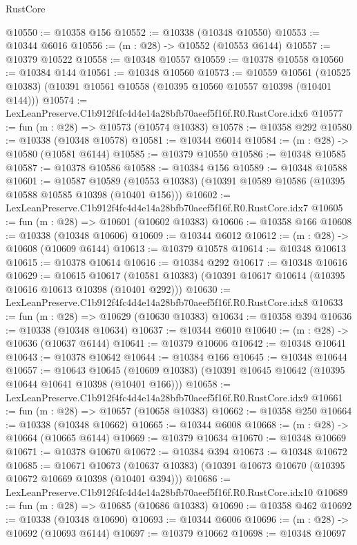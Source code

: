 \begin{lexlean}{RustCore}
\begin{coremodule}
@10550 := @10358 @156
@10552 := @10338 (@10348 @10550)
@10553 := @10344 @6016
@10556 := (m : @28) -> @10552 (@10553 @6144)
@10557 := @10379 @10522
@10558 := @10348 @10557
@10559 := @10378 @10558
@10560 := @10384 @144
@10561 := @10348 @10560
@10573 := @10559
    @10561
    (@10525 @10383)
    (@10391 @10561 @10558 (@10395 @10560 @10557 @10398 (@10401 @144)))
@10574 := LexLeanPreserve.C1b912f4fc4d4e14a28bfb70aeef5f16f.R0.RustCore.idx6
@10577 := fun (m : @28) => @10573 (@10574 @10383)
@10578 := @10358 @292
@10580 := @10338 (@10348 @10578)
@10581 := @10344 @6014
@10584 := (m : @28) -> @10580 (@10581 @6144)
@10585 := @10379 @10550
@10586 := @10348 @10585
@10587 := @10378 @10586
@10588 := @10384 @156
@10589 := @10348 @10588
@10601 := @10587
    @10589
    (@10553 @10383)
    (@10391 @10589 @10586 (@10395 @10588 @10585 @10398 (@10401 @156)))
@10602 := LexLeanPreserve.C1b912f4fc4d4e14a28bfb70aeef5f16f.R0.RustCore.idx7
@10605 := fun (m : @28) => @10601 (@10602 @10383)
@10606 := @10358 @166
@10608 := @10338 (@10348 @10606)
@10609 := @10344 @6012
@10612 := (m : @28) -> @10608 (@10609 @6144)
@10613 := @10379 @10578
@10614 := @10348 @10613
@10615 := @10378 @10614
@10616 := @10384 @292
@10617 := @10348 @10616
@10629 := @10615
    @10617
    (@10581 @10383)
    (@10391 @10617 @10614 (@10395 @10616 @10613 @10398 (@10401 @292)))
@10630 := LexLeanPreserve.C1b912f4fc4d4e14a28bfb70aeef5f16f.R0.RustCore.idx8
@10633 := fun (m : @28) => @10629 (@10630 @10383)
@10634 := @10358 @394
@10636 := @10338 (@10348 @10634)
@10637 := @10344 @6010
@10640 := (m : @28) -> @10636 (@10637 @6144)
@10641 := @10379 @10606
@10642 := @10348 @10641
@10643 := @10378 @10642
@10644 := @10384 @166
@10645 := @10348 @10644
@10657 := @10643
    @10645
    (@10609 @10383)
    (@10391 @10645 @10642 (@10395 @10644 @10641 @10398 (@10401 @166)))
@10658 := LexLeanPreserve.C1b912f4fc4d4e14a28bfb70aeef5f16f.R0.RustCore.idx9
@10661 := fun (m : @28) => @10657 (@10658 @10383)
@10662 := @10358 @250
@10664 := @10338 (@10348 @10662)
@10665 := @10344 @6008
@10668 := (m : @28) -> @10664 (@10665 @6144)
@10669 := @10379 @10634
@10670 := @10348 @10669
@10671 := @10378 @10670
@10672 := @10384 @394
@10673 := @10348 @10672
@10685 := @10671
    @10673
    (@10637 @10383)
    (@10391 @10673 @10670 (@10395 @10672 @10669 @10398 (@10401 @394)))
@10686 := LexLeanPreserve.C1b912f4fc4d4e14a28bfb70aeef5f16f.R0.RustCore.idx10
@10689 := fun (m : @28) => @10685 (@10686 @10383)
@10690 := @10358 @462
@10692 := @10338 (@10348 @10690)
@10693 := @10344 @6006
@10696 := (m : @28) -> @10692 (@10693 @6144)
@10697 := @10379 @10662
@10698 := @10348 @10697

\end{coremodule}
\end{lexlean}
